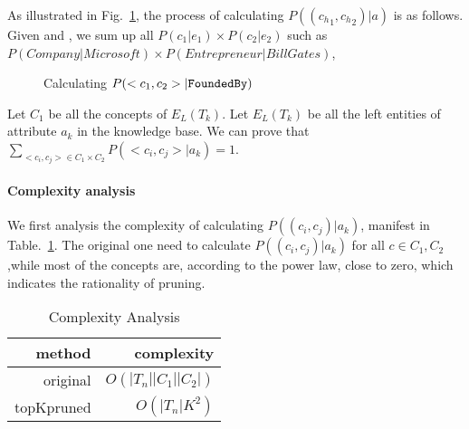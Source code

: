 \begin{example}[Calculating $P(<{c_h}_{1},{c_h}_{2}> |a)$]
\label{exa:pggga}
As illustrated in Fig.~\ref{fig:bipartite}, the process of calculating $P(({c_h}_{1},{c_h}_{2}) |a)$ is as follows.
Given  and , we sum up all $P(c_1|e_1)\times P(c_2|e_2) $ such as $P(Company|Microsoft) \times P(Entrepreneur|Bill Gates)$,
\end{example}


\begin{figure}[!htb]
\centering {}
\caption{Calculating $P( <{c}_{1},{c}_{2}> | {\tt FoundedBy} )$ } \label{fig:bipartite}
\end{figure}





Let $C_1$ be all the concepts of $E_L(T_k)$.
Let $E_L(T_k)$ be all the left entities of attribute $a_k$ in the knowledge base.
We can prove that $\sum_{<c_i,c_j>\in C_1\times C_2} P(<c_i, c_j>|a_k)=1$.

\paragraph{Complexity analysis}

We first analysis the complexity of calculating $P((c_i, c_j)|a_k)$, manifest in Table.~\ref{tab:complexity}. The original one need to calculate $P((c_i, c_j)|a_k)$ for all $c \in C_1,C_2 $,while most of the concepts are, according to the power law, close to zero, which indicates the rationality of pruning.


\begin{table}[htbp]
  \centering
  \caption{Complexity Analysis}
    \begin{tabular}{rr}
    \toprule
    method & complexity \\
    \midrule
    original &  $O(|T_n||C_1||C_2|)$ \\
    topKpruned & $O(|T_n|K^2)$ \\
    \bottomrule
    \end{tabular}%
  \label{tab:complexity}%
\end{table}%



